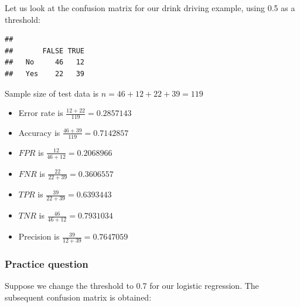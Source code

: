 \documentclass[
]{book}
\newenvironment{Shaded}{\begin{snugshade}}{\end{snugshade}}
\newcommand{\DocumentationTok}[1]{\textcolor[rgb]{0.56,0.35,0.01}{\textbf{\textit{#1}}}}
\newcommand{\FloatTok}[1]{\textcolor[rgb]{0.00,0.00,0.81}{#1}}
\newcommand{\FunctionTok}[1]{\textcolor[rgb]{0.13,0.29,0.53}{\textbf{#1}}}
\newcommand{\NormalTok}[1]{#1}
\newcommand{\SpecialCharTok}[1]{\textcolor[rgb]{0.81,0.36,0.00}{\textbf{#1}}}
\providecommand{\tightlist}{%
  \setlength{\itemsep}{0pt}\setlength{\parskip}{0pt}}
\begin{document}
Let us look at the confusion matrix for our drink driving example, using 0.5 as a threshold:

\begin{Shaded}
\end{Shaded}

\begin{verbatim}
##      
##       FALSE TRUE
##   No     46   12
##   Yes    22   39
\end{verbatim}

Sample size of test data is \(n = 46+12+22+39 = 119\)

\begin{itemize}
\tightlist
\item
  Error rate is \(\frac{12+22}{119} = 0.2857143\)
\item
  Accuracy is \(\frac{46+39}{119} = 0.7142857\)
\item
  \(FPR\) is \(\frac{12}{46+12} = 0.2068966\)
\item
  \(FNR\) is \(\frac{22}{22+39} = 0.3606557\)
\item
  \(TPR\) is \(\frac{39}{22+39} = 0.6393443\)
\item
  \(TNR\) is \(\frac{46}{46+12} = 0.7931034\)
\item
  Precision is \(\frac{39}{12+39} = 0.7647059\)
\end{itemize}

\hypertarget{practice-question-3}{%
\subsubsection{Practice question}\label{practice-question-3}}

Suppose we change the threshold to 0.7 for our logistic regression. The subsequent confusion matrix is obtained:

\begin{Shaded}
\end{Shaded}
\end{document}

